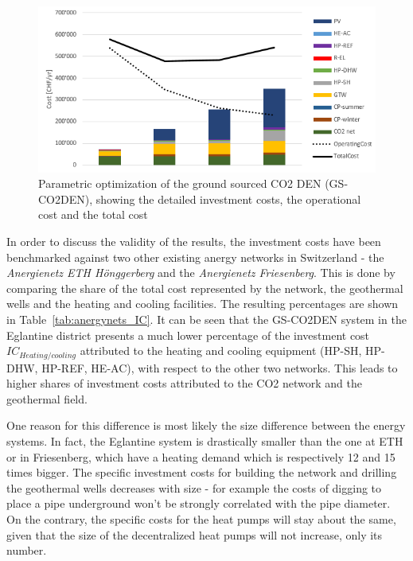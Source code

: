 \documentclass{article}
\begin{document}
\begin{figure}[htp]
	\centering
	\includegraphics[width=1\textwidth]{V_CO2_G_PO1.png}
	\caption{Parametric optimization of the ground sourced CO2 DEN (GS-CO2DEN), showing the detailed investment costs, the operational cost and the total cost}
	\label{fig:V_CO2_G_PO}
\end{figure}

In order to discuss the validity of the results, the investment costs have been benchmarked against two other existing anergy networks in Switzerland - the \textit{Anergienetz ETH Hönggerberg }and the \textit{Anergienetz Friesenberg}. This is done by comparing the share of the total cost represented by the network, the geothermal wells and the heating and cooling facilities. The resulting percentages are shown in Table~\ref{tab:anergynets_IC}. It can be seen that the GS-CO2DEN system in the Eglantine district presents a much lower percentage of the investment cost  $IC_{Heating/cooling}$ attributed to the heating and cooling equipment (HP-SH, HP-DHW, HP-REF, HE-AC), with respect to the other two networks. This leads to higher shares of investment costs attributed to the CO2 network and the geothermal field.



One reason for this difference is most likely the size difference between the energy systems. In fact, the Eglantine system is drastically smaller than the one at ETH or in Friesenberg, which have a heating demand which is respectively 12 and 15 times bigger. The specific investment costs for building the network and drilling the geothermal wells decreases with size - for example the costs of digging to place a pipe underground won't be strongly correlated with the pipe diameter. On the contrary, the specific costs for the heat pumps will stay about the same, given that the size of the decentralized heat pumps will not increase, only its number.
\end{document}
